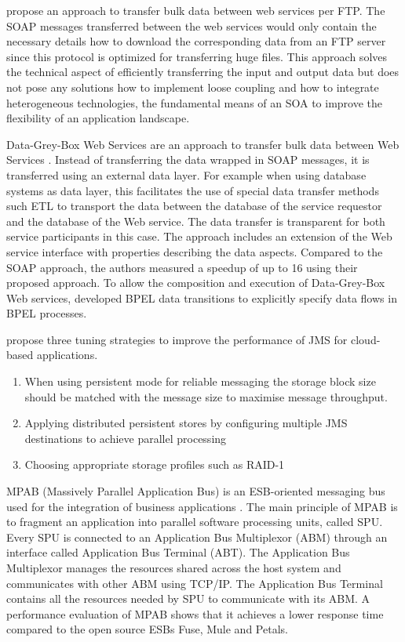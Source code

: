 \cite{Wichaiwong:2007oq} propose an approach to transfer bulk data between web services per FTP. The SOAP messages transferred between the web services would only contain the necessary details how to download the corresponding data from an FTP server since this protocol is optimized for transferring huge files. This approach solves the technical aspect of efficiently transferring the input and output data but does not pose any solutions how to implement loose coupling and how to integrate heterogeneous technologies, the fundamental means of an SOA to improve the flexibility of an application landscape.

Data-Grey-Box Web Services are an approach to transfer bulk data between Web Services \citep{Habich:2007ij}. Instead of transferring the data wrapped in SOAP messages, it is transferred using an external data layer. For example when using database systems as data layer, this facilitates the use of special data transfer methods such \ac{ETL} to transport the data between the database of the service requestor and the database of the Web service. The data transfer is transparent for both service participants in this case. The approach includes an extension of the Web service interface with properties describing the data aspects. Compared to the SOAP approach, the authors measured a speedup of up to 16 using their proposed approach. To allow the composition and execution of Data-Grey-Box Web services, \cite{Habich:kl} developed BPEL data transitions to explicitly specify data flows in BPEL processes.

\cite{Zhuang:2012qf} propose three tuning strategies to improve the performance of \ac{JMS} for cloud-based applications.
\begin{enumerate}
	\item When using persistent mode for reliable messaging the storage block size should be matched with the message size to maximise message throughput.
	\item Applying distributed persistent stores by configuring multiple JMS destinations to achieve parallel processing
	\item Choosing appropriate storage profiles such as RAID-1
\end{enumerate}

MPAB (Massively Parallel Application Bus) is an ESB-oriented messaging bus used for the integration of business applications \citep{Benosman:2012zr}. The main principle of MPAB is to fragment an application into parallel software processing units, called SPU. Every SPU is connected to an Application Bus Multiplexor (ABM) through an interface called Application Bus Terminal (ABT). The Application Bus Multiplexor manages the resources shared across the host system and communicates with other ABM using TCP/IP. The Application Bus Terminal contains all the resources needed by SPU to communicate with its ABM. A performance evaluation of MPAB shows that it achieves a lower response time compared to the open source ESBs Fuse, Mule and Petals.

